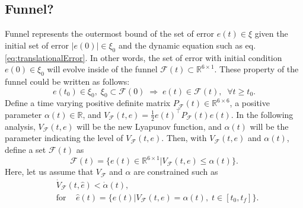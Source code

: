 \documentclass[letterpaper, 10 pt, conference]{ieeeconf}  %
\begin{document}
\subsection{Funnel?}
Funnel represents the outermost bound of the set of error $e(t)\in \xi$ given the initial set of error $|e(0)| \in \xi_0$ and the dynamic equation such as eq.\eqref{eq:translationalError}.
In other words, the set of error with initial condition $e(0) \in \xi_0$ will evolve inside of the funnel $\mathcal{F}(t) \subset \mathbb{R}^{6\times 1}$.
These property of the funnel could be written as follows:
\begin{equation}
e(t_0) \in \xi_0,\;\xi_0 \subset \mathcal{F}(0)\;\Rightarrow\; e(t) \in \mathcal{F}(t),\;\;\forall t \geq t_0. \label{eq:funnel1}
\end{equation}
Define a time varying positive definite matrix $P_\mathcal{F}(t) \in \mathbb{R}^{6\times 6}$, a positive parameter $\alpha(t) \in \mathbb{R}$, and $V_\mathcal{F}(t,e) = \frac{1}{2}e(t)^\intercal P_\mathcal{F}(t) e(t)$.
In the following analysis, $V_\mathcal{F}(t,e)$ will be the new Lyapunov function, and $\alpha(t)$ will be the parameter indicating the level of $V_\mathcal{F}(t,e)$.
Then, with $V_\mathcal{F}(t,e)$ and $\alpha(t)$, define a set $\mathcal{F}(t)$ as 
\begin{equation}
\mathcal{F}(t) = \{e(t) \in \mathbb{R}^{6\times 1} | V_\mathcal{F}(t,e) \leq \alpha(t)\}. \label{eq:funnel2}
\end{equation}
Here, let us assume that $V_\mathcal{F}$ and $\alpha$ are constrained such as
\begin{align}
&\dot{V}_\mathcal{F}(t,\hat{e}) < \dot{\alpha}(t), \label{eq:funnel3} \\
&\text{for }\;\;\;\hat{e}(t) = \{e(t)|V_\mathcal{F}(t,e) = \alpha(t),\;t\in[t_0,t_f]\}. \nonumber
\end{align}
\end{document}
